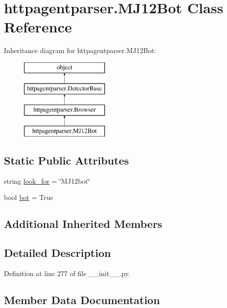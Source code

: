 \hypertarget{classhttpagentparser_1_1_m_j12_bot}{}\section{httpagentparser.\+M\+J12\+Bot Class Reference}
\label{classhttpagentparser_1_1_m_j12_bot}
Inheritance diagram for httpagentparser.\+M\+J12\+Bot\+:\begin{figure}[H]
\begin{center}
\leavevmode
\includegraphics[height=4.000000cm]{classhttpagentparser_1_1_m_j12_bot}
\end{center}
\end{figure}
\subsection*{Static Public Attributes}
\begin{DoxyCompactItemize}
\item 
string \hyperlink{classhttpagentparser_1_1_m_j12_bot_a878ce1763728e3db7067f23274dcdf1e}{look\+\_\+for} = \char`\"{}M\+J12bot\char`\"{}
\item 
bool \hyperlink{classhttpagentparser_1_1_m_j12_bot_a5d8f17c3c1ed168fcf840eed8bf3e46b}{bot} = True
\end{DoxyCompactItemize}
\subsection*{Additional Inherited Members}


\subsection{Detailed Description}


Definition at line 277 of file \+\_\+\+\_\+init\+\_\+\+\_\+.\+py.



\subsection{Member Data Documentation}
\hypertarget{classhttpagentparser_1_1_m_j12_bot_a5d8f17c3c1ed168fcf840eed8bf3e46b}{}\label{classhttpagentparser_1_1_m_j12_bot_a5d8f17c3c1ed168fcf840eed8bf3e46b} 
